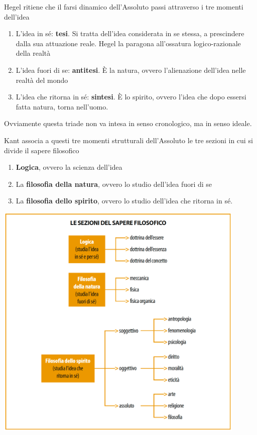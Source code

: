 \documentclass[a4paper, twoside, titlepage]{book}
\begin{document}
Hegel ritiene che il farsi dinamico dell'Assoluto passi attraverso i tre momenti dell'idea
\begin{enumerate}
\item L'idea in sé: \textbf{tesi}. Si tratta dell'idea considerata in se stessa, a prescindere dalla sua attuazione reale. Hegel la paragona all'ossatura logico-razionale della realtà
\item L'idea fuori di se: \textbf{antitesi}. È la natura, ovvero l'alienazione dell'idea nelle realtà del mondo
\item L'idea che ritorna in sé: \textbf{sintesi}. È lo spirito, ovvero l'idea che dopo essersi fatta natura, torna nell'uomo.
\end{enumerate}

Ovviamente questa triade non va intesa in senso cronologico, ma in senso ideale.

Kant associa a questi tre momenti strutturali dell'Assoluto le tre sezioni in cui si divide il sapere filosofico
\begin{enumerate}
\item \textbf{Logica}, ovvero la scienza dell'idea
\item La \textbf{filosofia della natura}, ovvero lo studio dell'idea fuori di se
\item La \textbf{filosofia dello spirito}, ovvero lo studio dell'idea che ritorna in sé.
\end{enumerate}

\begin{center}
\includegraphics[width=12cm]{4}
\end{center}
\end{document}
